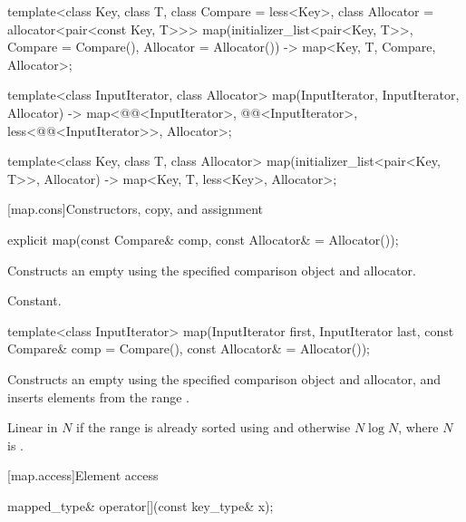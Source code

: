 \begin{codeblock}
{  template<class Key, class T, class Compare = less<Key>,
           class Allocator = allocator<pair<const Key, T>>>
    map(initializer_list<pair<Key, T>>, Compare = Compare(), Allocator = Allocator())
      -> map<Key, T, Compare, Allocator>;

  template<class InputIterator, class Allocator>
    map(InputIterator, InputIterator, Allocator)
      -> map<@@<InputIterator>, @@<InputIterator>,
             less<@@<InputIterator>>, Allocator>;

  template<class Key, class T, class Allocator>
    map(initializer_list<pair<Key, T>>, Allocator) -> map<Key, T, less<Key>, Allocator>;
}
\end{codeblock}


[map.cons]{Constructors, copy, and assignment}%
%

%
\begin{itemdecl}
explicit map(const Compare& comp, const Allocator& = Allocator());
\end{itemdecl}

\begin{itemdescr}
\pnum
\effects
Constructs an empty
using the specified comparison object and allocator.

\pnum
\complexity
Constant.
\end{itemdescr}

%
\begin{itemdecl}
template<class InputIterator>
  map(InputIterator first, InputIterator last,
      const Compare& comp = Compare(), const Allocator& = Allocator());
\end{itemdecl}

\begin{itemdescr}
\pnum
\effects
Constructs an empty
using the specified comparison object and allocator,
and inserts elements from the range
.

\pnum
\complexity
Linear in $N$ if the range
is already sorted using 
and otherwise $N \log N$, where $N$
is .
\end{itemdescr}

[map.access]{Element access}

%
\begin{itemdecl}
mapped_type& operator[](const key_type& x);
\end{itemdecl}

